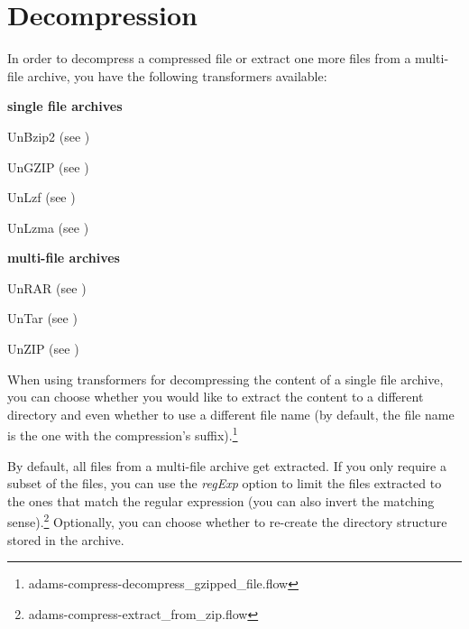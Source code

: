 \documentclass[a4paper]{book}
\begin{document}
\chapter{Decompression}
In order to decompress a compressed file or extract one more files from a
multi-file archive, you have the following transformers available:
\begin{tight_itemize}
	\item \textbf{single file archives}
	\begin{tight_itemize}
		\item UnBzip2 (see \cite{bzip2})
		\item UnGZIP (see \cite{gzip})
		\item UnLzf (see \cite{lzf})
		\item UnLzma (see \cite{lzma})
	\end{tight_itemize}
	\item \textbf{multi-file archives}
	\begin{tight_itemize}
		\item UnRAR (see \cite{rar})
		\item UnTar (see \cite{tar})
		\item UnZIP (see \cite{zip})
	\end{tight_itemize}
\end{tight_itemize}

When using transformers for decompressing the content of a single file archive,
you can choose whether you would like to extract the content to a different 
directory and even whether to use a different file name (by default, the file name
is the one with the compression's suffix).\footnote{adams-compress-decompress\_gzipped\_file.flow}

By default, all files from a multi-file archive get extracted. If you only 
require a subset of the files, you can use the \textit{regExp} option to
limit the files extracted to the ones that match the regular expression (you
can also invert the matching sense).\footnote{adams-compress-extract\_from\_zip.flow}
Optionally, you can choose whether to re-create the directory structure 
stored in the archive.


\end{document}
